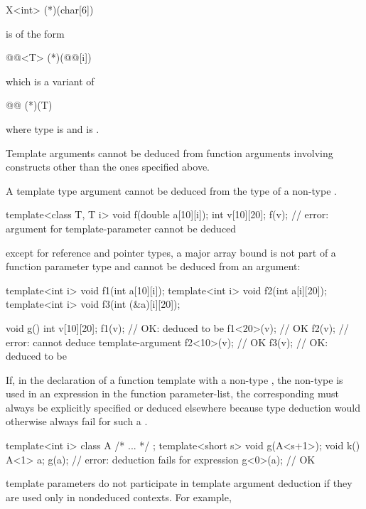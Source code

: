 \begin{codeblock}
X<int> (*)(char[6])
\end{codeblock}

is of the form

\begin{codeblock}
@@<T> (*)(@@[i])
\end{codeblock}

which is a variant of

\begin{codeblock}
@@ (*)(T)
\end{codeblock}

where type is
and
is
.
\exitexample

\pnum
Template arguments cannot be deduced from function arguments involving
constructs other than the ones specified above.

\pnum
A template type argument cannot be deduced from the type of a non-type
.
\enterexample
\begin{codeblock}
template<class T, T i> void f(double a[10][i]);
int v[10][20];
f(v);				// error: argument for template-parameter  cannot be deduced
\end{codeblock}
\exitexampleb

\pnum
\enternote
except for reference and pointer types, a major array bound is not part of a
function parameter type and cannot be deduced from an argument:

\begin{codeblock}
template<int i> void f1(int a[10][i]);
template<int i> void f2(int a[i][20]);
template<int i> void f3(int (&a)[i][20]);

void g()
{
	int v[10][20];
	f1(v);			// OK:  deduced to be 
	f1<20>(v);		// OK
	f2(v);			// error: cannot deduce template-argument 
	f2<10>(v);		// OK
	f3(v);			// OK:  deduced to be 
}
\end{codeblock}

\pnum
If, in the declaration of a function template with a non-type
, the non-type 
is used in an expression in the function parameter-list, the corresponding
 must always be explicitly specified or
deduced elsewhere because type deduction would otherwise always fail
for such a .
\begin{codeblock}
template<int i> class A { /* ... */ };
template<short s> void g(A<s+1>);
void k() {
    A<1> a;
    g(a);			// error: deduction fails for expression 
    g<0>(a);			// OK
}
\end{codeblock}
\exitnoteb
\enternote
template parameters do not participate in template argument deduction if
they are used only in nondeduced contexts. For example,

